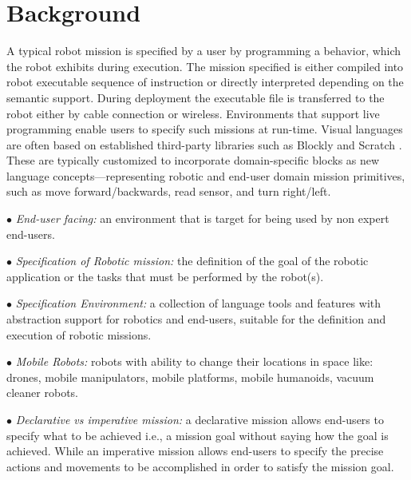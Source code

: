 \section{Background}
A typical robot mission is specified by a user by programming a behavior, which the robot exhibits during execution. The mission specified is either compiled into robot executable sequence of instruction or directly interpreted depending on the semantic support. During deployment the executable file is transferred to the robot either by cable connection or wireless. Environments that support live programming enable users to specify such missions at run-time. Visual languages are often based on established third-party libraries such as Blockly \cite{blockly} and Scratch \cite{Kaucic2015}. These are typically customized to incorporate domain-specific blocks as new language concepts---representing robotic and end-user domain mission primitives, such as move forward/backwards, read sensor, and turn right/left.


$\bullet$ \emph{End-user facing:} an environment that is target for being used by non expert end-users. %

$\bullet$ \emph{Specification of Robotic mission:} the definition of the goal of the robotic application or the tasks that must be performed by the robot(s).

$\bullet$ \emph{Specification  Environment:} a collection of language tools and features with abstraction support for robotics and end-users, suitable for the definition and execution of robotic missions.

$\bullet$ \emph{Mobile Robots:} robots with ability to change  their locations in space like: drones, mobile manipulators, mobile platforms, mobile humanoids, vacuum cleaner robots.

$\bullet$ \emph{Declarative vs imperative mission:} a declarative mission allows end-users to specify what to be achieved i.e., a mission goal without saying how the goal is achieved. While an  imperative mission allows end-users to specify the precise actions and movements to be accomplished in order to satisfy the mission goal. %

